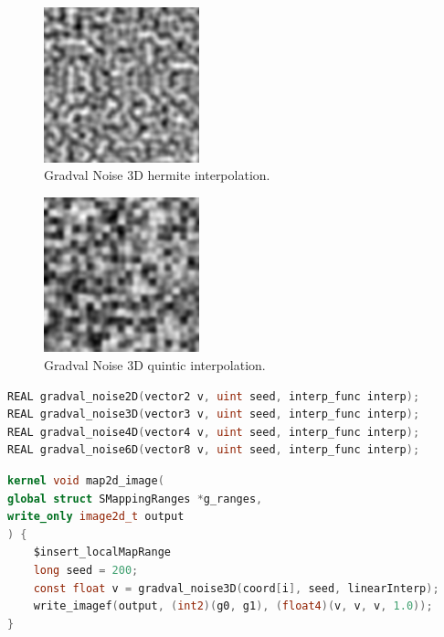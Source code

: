 \begin{figure}[h]
\centering
\includegraphics[width=0.4\textwidth]{out/noise_functions/gradval_noise3D_hermiteInterp.png}
\caption{Gradval Noise 3D hermite interpolation.}
\label{fig:gradval_noise3D_hermiteInterp}
\end{figure}

\begin{figure}[h]
\centering
\includegraphics[width=0.4\textwidth]{out/noise_functions/gradval_noise2D_quinticInterp.png}
\caption{Gradval Noise 3D quintic interpolation.}
\label{fig:gradval_noise2D_quinticInterp}
\end{figure}

\begin{lstlisting}[caption={Definition of gradval noise functions},label={lst:gradval_noise_definition},language=OpenCL]
REAL gradval_noise2D(vector2 v, uint seed, interp_func interp);
REAL gradval_noise3D(vector3 v, uint seed, interp_func interp);
REAL gradval_noise4D(vector4 v, uint seed, interp_func interp);
REAL gradval_noise6D(vector8 v, uint seed, interp_func interp);
\end{lstlisting}

\begin{lstlisting}[caption={Example for gradval noise functions},label={lst:gradval_noise_example},language=OpenCL]
kernel void map2d_image(
global struct SMappingRanges *g_ranges,
write_only image2d_t output
) {
    $insert_localMapRange
    long seed = 200;
    const float v = gradval_noise3D(coord[i], seed, linearInterp);
    write_imagef(output, (int2)(g0, g1), (float4)(v, v, v, 1.0));
}
\end{lstlisting}

